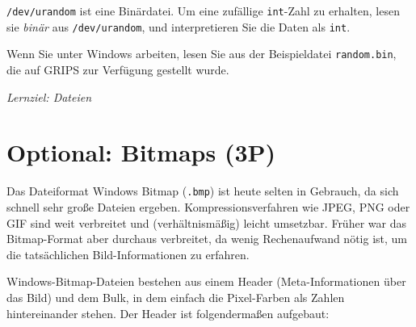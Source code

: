 \documentclass[
	ngerman,
	fontsize=10pt,
	parskip=half,
	titlepage=true,
	DIV=12
]{scrartcl}
\begin{document}
\texttt{/dev/urandom} ist eine Binärdatei. Um eine zufällige \texttt{int}-Zahl zu erhalten,
lesen sie \emph{binär} aus \texttt{/dev/urandom}, und interpretieren Sie die Daten als \texttt{int}.

Wenn Sie unter Windows arbeiten, lesen Sie aus der Beispieldatei \texttt{random.bin}, die auf GRIPS zur Verfügung gestellt wurde.

\emph{Lernziel: Dateien}



\section{Optional: Bitmaps (3P)}
Das Dateiformat Windows Bitmap (\texttt{.bmp}) ist heute selten in Gebrauch, da sich schnell sehr große Dateien ergeben. Kompressionsverfahren wie JPEG, PNG oder GIF sind weit verbreitet und (verhältnismäßig) leicht umsetzbar. Früher war das Bitmap-Format aber durchaus verbreitet, da wenig Rechenaufwand nötig ist, um die tatsächlichen Bild-Informationen zu erfahren.

Windows-Bitmap-Dateien bestehen aus einem Header (Meta-Informationen über das Bild) und dem Bulk, in dem einfach die Pixel-Farben als Zahlen hintereinander stehen. Der Header ist folgendermaßen aufgebaut:
\end{document}
